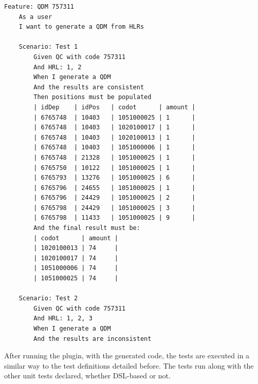 \begin{lstlisting}[frame=single, language=Cucumber, caption={\it Cucumber feature}, label={code:cucumber}]
Feature: QDM 757311
	As a user
	I want to generate a QDM from HLRs

	Scenario: Test 1
		Given QC with code 757311
		And HRL: 1, 2
		When I generate a QDM
		And the results are consistent
		Then positions must be populated
		| idDep    | idPos   | codot      | amount |
		| 6765748  | 10403   | 1051000025 | 1      |
		| 6765748  | 10403   | 1020100017 | 1      |
		| 6765748  | 10403   | 1020100013 | 1      |
		| 6765748  | 10403   | 1051000006 | 1      |
		| 6765748  | 21328   | 1051000025 | 1      |
		| 6765750  | 10122   | 1051000025 | 1      |    
		| 6765793  | 13276   | 1051000025 | 6      |
		| 6765796  | 24655   | 1051000025 | 1      |
		| 6765796  | 24429   | 1051000025 | 2      |
		| 6765798  | 24429   | 1051000025 | 3      |
		| 6765798  | 11433   | 1051000025 | 9      |   
		And the final result must be:
		| codot      | amount |
		| 1020100013 | 74     |
		| 1020100017 | 74     |
		| 1051000006 | 74     |
		| 1051000025 | 74     |

	Scenario: Test 2
		Given QC with code 757311
		And HRL: 1, 2, 3
		When I generate a QDM
		And the results are inconsistent    
\end{lstlisting}



After running the plugin, with the generated code, the tests are executed in a similar way to the test 
definitions detailed before. The tests run along with the other unit tests declared, 
whether DSL-based or not.
